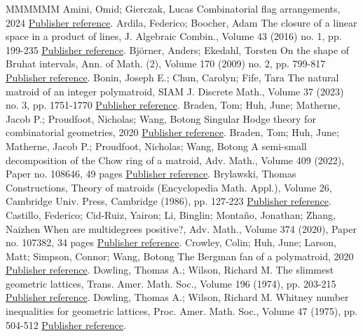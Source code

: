 \documentclass[11pt]{article}
\theoremstyle{definition}
\numberwithin{equation}{section}
\begin{document}
\begin{thebibliography}{MMMMMM}
 Amini, Omid; Gierczak, Lucas Combinatorial flag arrangements, 2024 \href{https://alco.centre-mersenne.org/articles/10.5802/alco.447/#AG24}{Publisher reference}.
 Ardila, Federico; Boocher, Adam The closure of a linear space in a product of lines, J. Algebraic Combin., Volume 43 (2016) no. 1, pp. 199-235 \href{https://alco.centre-mersenne.org/articles/10.5802/alco.447/#AB16}{Publisher reference}.
 Björner, Anders; Ekedahl, Torsten On the shape of Bruhat intervals, Ann. of Math. (2), Volume 170 (2009) no. 2, pp. 799-817 \href{https://alco.centre-mersenne.org/articles/10.5802/alco.447/#BE09}{Publisher reference}.
 Bonin, Joseph E.; Chun, Carolyn; Fife, Tara The natural matroid of an integer polymatroid, SIAM J. Discrete Math., Volume 37 (2023) no. 3, pp. 1751-1770 \href{https://alco.centre-mersenne.org/articles/10.5802/alco.447/#BCF22}{Publisher reference}.
 Braden, Tom; Huh, June; Matherne, Jacob P.; Proudfoot, Nicholas; Wang, Botong Singular Hodge theory for combinatorial geometries, 2020 \href{https://alco.centre-mersenne.org/articles/10.5802/alco.447/#BHMPW20b}{Publisher reference}.
 Braden, Tom; Huh, June; Matherne, Jacob P.; Proudfoot, Nicholas; Wang, Botong A semi-small decomposition of the Chow ring of a matroid, Adv. Math., Volume 409 (2022), Paper no. 108646, 49 pages \href{https://alco.centre-mersenne.org/articles/10.5802/alco.447/#BHMPW20}{Publisher reference}.
 Brylawski, Thomas Constructions, Theory of matroids (Encyclopedia Math. Appl.), Volume 26, Cambridge Univ. Press, Cambridge (1986), pp. 127-223 \href{https://alco.centre-mersenne.org/articles/10.5802/alco.447/#B86}{Publisher reference}.
 Castillo, Federico; Cid-Ruiz, Yairon; Li, Binglin; Montaño, Jonathan; Zhang, Naizhen When are multidegrees positive?, Adv. Math., Volume 374 (2020), Paper no. 107382, 34 pages \href{https://alco.centre-mersenne.org/articles/10.5802/alco.447/#CFCYL20}{Publisher reference}.
 Crowley, Colin; Huh, June; Larson, Matt; Simpson, Connor; Wang, Botong The Bergman fan of a polymatroid, 2020 \href{https://alco.centre-mersenne.org/articles/10.5802/alco.447/#CHLSW22}{Publisher reference}.
 Dowling, Thomas A.; Wilson, Richard M. The slimmest geometric lattices, Trans. Amer. Math. Soc., Volume 196 (1974), pp. 203-215 \href{https://alco.centre-mersenne.org/articles/10.5802/alco.447/#DW74}{Publisher reference}.
 Dowling, Thomas A.; Wilson, Richard M. Whitney number inequalities for geometric lattices, Proc. Amer. Math. Soc., Volume 47 (1975), pp. 504-512 \href{https://alco.centre-mersenne.org/articles/10.5802/alco.447/#DW75}{Publisher reference}.

\end{thebibliography}
\end{document}
